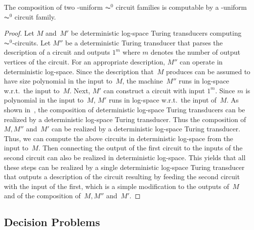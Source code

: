\begin{proposition}\label{prelim:prop:AC0-composition}
	The composition of two \LOGSPACE-uniform $\AC^0$ circuit families
	is computable by a \LOGSPACE-uniform $\AC^0$ circuit family.	
\end{proposition}
\begin{proof}
	Let $M$ and~$M'$ be deterministic log-space Turing transducers computing $\AC^0$-circuits.
	Let $M''$ be a deterministic Turing transducer that parses the description
	of a circuit and outputs $1^m$ where $m$ denotes the number of output 
	vertices of the circuit. For an appropriate description, $M''$ can operate in deterministic log-space.
	Since the description that~$M$ produces can be assumed to have size polynomial in the input to~$M$,
	the machine~$M''$ runs in log-space w.r.t.~the input to~$M$.
	Next, $M'$ can construct a circuit with input $1^m$.
	Since $m$ is polynomial in the input to~$M$, $M'$ runs in log-space w.r.t.~the input of~$M$.
	As shown in~\cite[p.~323]{HopUll79}, the composition of deterministic log-space Turing transducers
	can be realized by a deterministic log-space Turing transducer.
	Thus the composition of $M,M''$ and~$M'$ 
	can be realized by a deterministic log-space Turing transducer.
	Thus, we can compute the above circuits in deterministic log-space
	from the input to~$M$. Then connecting the output of the first circuit to the inputs
	of the second circuit can also be realized in deterministic log-space.
	This yields that all these steps can be realized by a single deterministic log-space Turing transducer
	that outputs a description of the circuit resulting by feeding the second circuit with the input
	of the first, which is a simple modification to the outputs of~$M$ and of the composition of~$M, M''$ and~$M'$. 
\end{proof}


\subsection{Decision Problems}
\label{prelim:sec:decision_problems}

